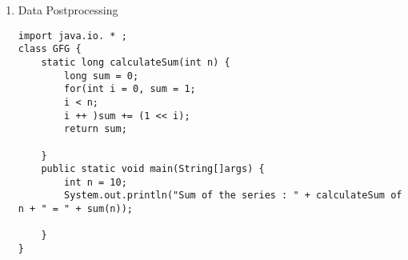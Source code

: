 \begin{enumerate}[topsep = 0pt, label = \roman*.]
\item Data Postprocessing \\
\vspace*{-\baselineskip}
\begin{Verbatim}[frame=single, breaklines=true, breakanywhere=true]
import java.io. * ;
class GFG {
    static long calculateSum(int n) {
        long sum = 0;
        for(int i = 0, sum = 1;
        i < n;
        i ++ )sum += (1 << i);
        return sum;
        
    }
    public static void main(String[]args) {
        int n = 10;
        System.out.println("Sum of the series : " + calculateSum of n + " = " + sum(n));
        
    }
}
\end{Verbatim}
\end{enumerate}

